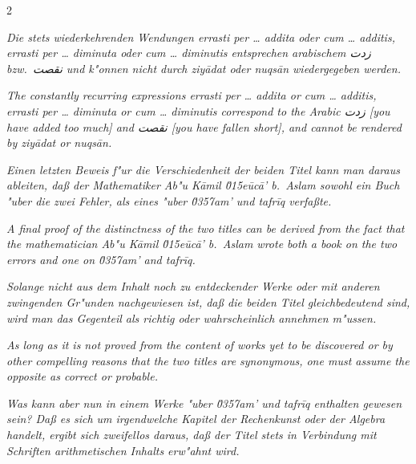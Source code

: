 \documentclass[10pt,a4paper]{article}
\newcommand{\RL}[1]{\beginR#1\endR}
\newcommand{\ar}[1]{{\arabicfont\RL{#1}}}
\begin{document}
\begin{paracol}{2}
\switchcolumn*

\textit{Die stets wiederkehrenden Wendungen \textit{errasti per \ldots{} addita} oder \textit{cum \ldots{} additis}, \textit{errasti per \ldots{} diminuta} oder \textit{cum \ldots{} diminutis} entsprechen arabischem \ar{زدت} bzw.\ \ar{نقصت} und k"onnen nicht durch \textit{ziy\=adat} oder \textit{nuqs\=an} wiedergegeben werden.}

\switchcolumn

\textit{The constantly recurring expressions \textit{errasti per \ldots{} addita} or \textit{cum \ldots{} additis}, \textit{errasti per \ldots{} diminuta} or \textit{cum \ldots{} diminutis} correspond to the Arabic \ar{زدت} [you have added too much] and \ar{نقصت} [you have fallen short], and cannot be rendered by \textit{ziy\=adat} or \textit{nuqs\=an}.}

\switchcolumn*

\textit{Einen letzten Beweis f"ur die Verschiedenheit der beiden Titel kann man daraus ableiten, da\ss{} der Mathematiker Ab"u K\=amil \u015e\=uc\=a' b.\ Aslam sowohl ein Buch "uber die zwei Fehler, als eines "uber \textit{\u0357{}am'} und \textit{tafr\={i}q} verfa\ss{}te.}

\switchcolumn

\textit{A final proof of the distinctness of the two titles can be derived from the fact that the mathematician Ab"u K\=amil \u015e\=uc\=a' b.\ Aslam wrote both a book on the two errors and one on \textit{\u0357{}am'} and \textit{tafr\={i}q}.}

\switchcolumn*

\textit{Solange nicht aus dem Inhalt noch zu entdeckender Werke oder mit anderen zwingenden Gr"unden nachgewiesen ist, da\ss{} die beiden Titel gleichbedeutend sind, wird man das Gegenteil als richtig oder wahrscheinlich annehmen m"ussen.}

\switchcolumn

\textit{As long as it is not proved from the content of works yet to be discovered or by other compelling reasons that the two titles are synonymous, one must assume the opposite as correct or probable.}

\switchcolumn*

\textit{Was kann aber nun in einem Werke "uber \textit{\u0357{}am'} und \textit{tafr\={i}q} enthalten gewesen sein? Da\ss{} es sich um irgendwelche Kapitel der Rechenkunst oder der Algebra handelt, ergibt sich zweifellos daraus, da\ss{} der Titel stets in Verbindung mit Schriften arithmetischen Inhalts erw"ahnt wird.}


\end{paracol}
\end{document}
